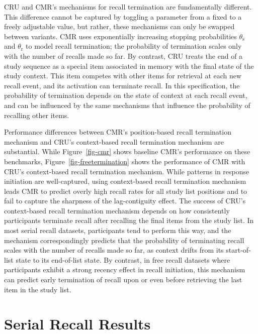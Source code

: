 \documentclass[
  letterpaper,
  DIV=11,
  numbers=noendperiod]{scrartcl}
\begin{document}
CRU and CMR's mechanisms for recall termination are fundamentally
different. This difference cannot be captured by toggling a parameter
from a fixed to a freely adjustable value, but rather, these mechanisms
can only be swapped between variants. CMR uses exponentially increasing
stopping probabilities \(\theta_\text{s}\) and \(\theta_\text{r}\) to
model recall termination; the probability of termination scales only
with the number of recalls made so far. By contrast, CRU treats the end
of a study sequence as a special item associated in memory with the
final state of the study context. This item competes with other items
for retrieval at each new recall event, and its activation can terminate
recall. In this specification, the probability of termination depends on
the state of context at each recall event, and can be influenced by the
same mechanisms that influence the probability of recalling other items.

Performance differences between CMR's position-based recall termination
mechanism and CRU's context-based recall termination mechanism are
substantial. While Figure~\ref{fig-cmr} shows baseline CMR's performance
on these benchmarks, Figure~\ref{fig-freetermination} shows the
performance of CMR with CRU's context-based recall termination
mechanism. While patterns in response initiation are well-captured,
using context-based recall termination mechanism leads CMR to predict
overly high recall rates for all study list positions and to fail to
capture the sharpness of the lag-contiguity effect. The success of CRU's
context-based recall termination mechanism depends on how consistently
participants terminate recall after recalling the final items from the
study list. In most serial recall datasets, participants tend to perform
this way, and the mechanism correspondingly predicts that the
probability of terminating recall scales with the number of recalls made
so far, as context drifts from its start-of-list state to its
end-of-list state. By contrast, in free recall datasets where
participants exhibit a strong recency effect in recall initiation, this
mechanism can predict early termination of recall upon or even before
retrieving the last item in the study list.

\section{Serial Recall Results}\label{serial-recall-results}
\end{document}
